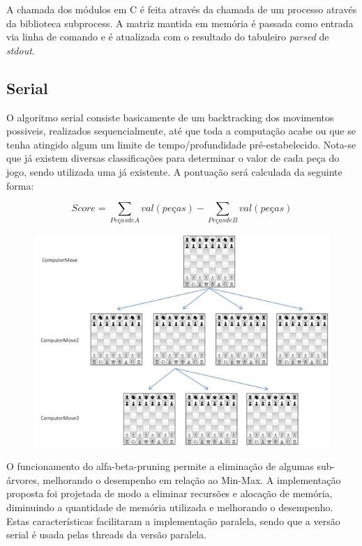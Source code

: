\documentclass[12pt,a4paper,final]{article}
\begin{document}
A chamada dos módulos em C é feita através da chamada de um processo através da biblioteca subprocess. A matriz mantida em memória é passada como entrada via linha de comando e é atualizada com o resultado do tabuleiro \textit{parsed} de \textit{stdout}.

\subsection{Serial}

O algoritmo serial consiste basicamente de um backtracking dos movimentos possiveis, realizados sequencialmente, até que toda a computação acabe ou que se tenha atingido algum um limite de tempo/profundidade pré-estabelecido. Nota-se que já existem diversas classificações para determinar o valor de cada peça do jogo, sendo utilizada uma já existente. A pontuação será calculada da seguinte forma:

\begin{equation}
Score = \sum_{Peças de A} val(peças) - \sum_{Peças de B} val(peças)
\end{equation}

\begin{figure}[H]
\centering
\includegraphics[scale=1]{../presentation/huoChess_2.jpg}
\end{figure}

O funcionamento do alfa-beta-pruning permite a eliminação de algumas sub-árvores, melhorando o desempenho em relação ao Min-Max. A implementação proposta foi projetada de modo a eliminar recursões e alocação de memória, diminuindo a quantidade de memória utilizada e melhorando o desempenho. Estas características facilitaram a implementação paralela, sendo que a versão serial é usada pelas threads da versão paralela.
\end{document}
